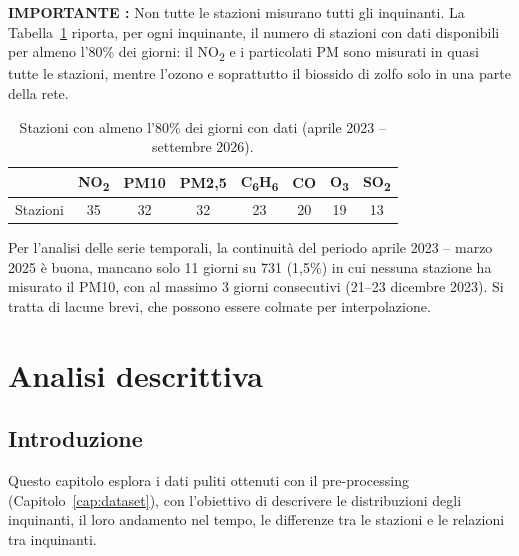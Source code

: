 \documentclass[11pt]{report}
\begin{document}
\textbf{IMPORTANTE :} Non tutte le stazioni misurano tutti gli inquinanti. La
Tabella~\ref{tab:copertura} riporta, per ogni inquinante, il numero di stazioni
con dati disponibili per almeno l'80\% dei giorni: il NO\textsubscript{2} e i
particolati PM sono misurati in quasi tutte le stazioni, mentre l'ozono e
soprattutto il biossido di zolfo solo in una parte della rete.

\begin{table}[H]
  \centering
  \caption{Stazioni con almeno l'80\% dei giorni con dati (aprile 2023 -- settembre 2026).}
  \label{tab:copertura}
  \begin{tabular}{l c c c c c c c}
    \toprule
             & NO\textsubscript{2} & PM10 & PM2,5 & C\textsubscript{6}H\textsubscript{6} & CO & O\textsubscript{3} & SO\textsubscript{2} \\
    \midrule
    Stazioni & 35                  & 32   & 32    & 23                                   & 20 & 19                 & 13                  \\
    \bottomrule
  \end{tabular}
\end{table}

Per l'analisi delle serie temporali, la continuità del periodo aprile 2023 --
marzo 2025 è buona, mancano solo 11 giorni su 731 (1,5\%) in cui nessuna
stazione ha misurato il PM10, con al massimo 3 giorni consecutivi (21--23
dicembre 2023). Si tratta di lacune brevi, che possono essere colmate per
interpolazione.

\chapter{Analisi descrittiva}
\label{cap:descrittiva}

\section{Introduzione}
\label{sec:intro_descrittiva}

Questo capitolo esplora i dati puliti ottenuti con il pre-processing
(Capitolo~\ref{cap:dataset}), con l'obiettivo di descrivere le distribuzioni
degli inquinanti, il loro andamento nel tempo, le differenze tra le stazioni e le
relazioni tra inquinanti.
\end{document}
